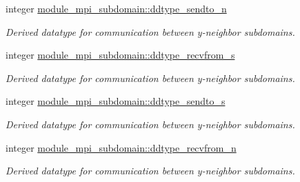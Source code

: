 \textbf{ }\par
\begin{DoxyCompactItemize}
\item 
integer \mbox{\hyperlink{namespacemodule__mpi__subdomain_a662c94173cf13879c5fea89a04fd8ffa}{module\+\_\+mpi\+\_\+subdomain\+::ddtype\+\_\+sendto\+\_\+n}}
\begin{DoxyCompactList}\small\item\em Derived datatype for communication between y-\/neighbor subdomains. \end{DoxyCompactList}\item 
integer \mbox{\hyperlink{namespacemodule__mpi__subdomain_ada96687f5bacdbe6f66c542c7b9ec37b}{module\+\_\+mpi\+\_\+subdomain\+::ddtype\+\_\+recvfrom\+\_\+s}}
\begin{DoxyCompactList}\small\item\em Derived datatype for communication between y-\/neighbor subdomains. \end{DoxyCompactList}\item 
integer \mbox{\hyperlink{namespacemodule__mpi__subdomain_a8d1c7ef37ac2dca93a693c070d77638b}{module\+\_\+mpi\+\_\+subdomain\+::ddtype\+\_\+sendto\+\_\+s}}
\begin{DoxyCompactList}\small\item\em Derived datatype for communication between y-\/neighbor subdomains. \end{DoxyCompactList}\item 
integer \mbox{\hyperlink{namespacemodule__mpi__subdomain_a200baef48d70fe5075d62807732c8db4}{module\+\_\+mpi\+\_\+subdomain\+::ddtype\+\_\+recvfrom\+\_\+n}}
\begin{DoxyCompactList}\small\item\em Derived datatype for communication between y-\/neighbor subdomains. \end{DoxyCompactList}\end{DoxyCompactItemize}


